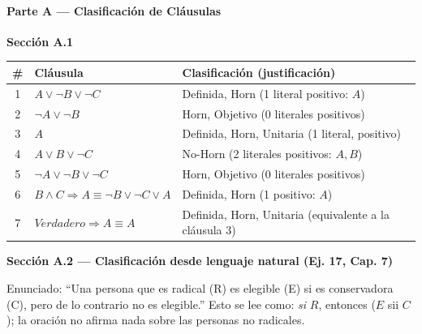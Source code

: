 \paragraph{Parte A --- Clasificación de Cláusulas}

\textbf{Sección A.1}

\begin{tabular}{cll}
    \toprule
    \# & Cláusula & Clasificación (justificación) \\
    \midrule
    1 & $A \lor \neg B \lor \neg C$ & Definida, Horn (1 literal positivo: $A$) \\
    2 & $\neg A \lor \neg B$ & Horn, Objetivo (0 literales positivos) \\
    3 & $A$ & Definida, Horn, Unitaria (1 literal, positivo) \\
    4 & $A \lor B \lor \neg C$ & No-Horn (2 literales positivos: $A, B$) \\
    5 & $\neg A \lor \neg B \lor \neg C$ & Horn, Objetivo (0 literales positivos) \\
    6 & $B \land C \Rightarrow A \equiv \neg B \lor \neg C \lor A$ & Definida, Horn (1 positivo: $A$) \\
    7 & $Verdadero \Rightarrow A \equiv A$ & Definida, Horn, Unitaria (equivalente a la cláusula 3) \\
    \bottomrule
\end{tabular}

\textbf{Sección A.2 --- Clasificación desde lenguaje natural (Ej. 17, Cap. 7)}

Enunciado: ``Una persona que es radical (R) es elegible (E) si es conservadora (C), pero de lo
contrario no es elegible.'' Esto se lee como: \emph{si} $R$, entonces ($E$ sii $C$); la oración no
afirma nada sobre las personas no radicales.

